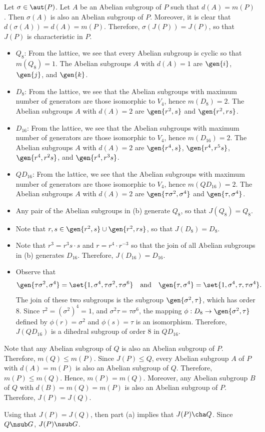 \begin{solenum}[spsol]
	\item Let $\sigma \in \aut(P)$.
	Let $A$ be an Abelian subgroup of $P$ such that $d(A) = m(P)$.
	Then $\sigma(A)$ is also an Abelian subgroup of $P$.
	Moreover, it is clear that $d(\sigma(A)) = d(A) = m(P)$.
	Therefore, $\sigma(J(P)) = J(P)$, so that $J(P)$ is characteristic in $P$.
	\item 
	\begin{itemize}
		\item $Q_8$: From the lattice, we see that every Abelian subgroup is cyclic so that $m(Q_8) = 1$.
	The Abelian subgroups $A$ with $d(A) = 1$ are $\gen{i}$, $\gen{j}$, and $\gen{k}$.
		\item $D_8$: From the lattice, we see that the Abelian subgroups with maximum number of generators are those isomorphic to $V_4$, hence $m(D_8) = 2$.
	The Abelian subgroups $A$ with $d(A) = 2$ are $\gen{r^2, s}$ and $\gen{r^2, rs}$.
		\item $D_{16}$: From the lattice, we see that the Abelian subgroups with maximum number of generators are those isomorphic to $V_4$, hence $m(D_{16}) = 2$.
	The Abelian subgroups $A$ with $d(A) = 2$ are $\gen{r^4, s}$, $\gen{r^4, r^5s}$, $\gen{r^4, r^2s}$, and $\gen{r^4, r^3s}$.
		\item $QD_{16}$: From the lattice, we see that the Abelian subgroups with maximum number of generators are those isomorphic to $V_4$, hence $m(QD_{16}) = 2$.
	The Abelian subgroups $A$ with $d(A) = 2$ are $\gen{\tau\sigma^2, \sigma^4}$ and $\gen{\tau, \sigma^4}$.
	\end{itemize}
	\item 
	\begin{itemize}
		\item Any pair of the Abelian subgroups in (b) generate $Q_8$, so that $J(Q_8) = Q_8$.
		\item Note that $r, s \in \gen{r^2, s} \cup \gen{r^2, rs}$, so that $J(D_8) = D_8$.
		\item Note that $r^3 = r^3s \cdot s$ and $r = r^4 \cdot r^{-3}$ so that the join of all Abelian subgroups in (b) generates $D_{16}$.
	Therefore, $J(D_{16}) = D_{16}$.
		\item Observe that
		\[
			\gen{\tau\sigma^2, \sigma^4} = \set{1, \sigma^4, \tau\sigma^2, \tau\sigma^6} \quad \text{and} \quad \gen{\tau, \sigma^4} = \set{1, \sigma^4, \tau, \tau\sigma^4}.
		\]
		The join of these two subgroups is the subgroup $\gen{\sigma^2, \tau}$, which has order 8.
	Since $\tau^2 = (\sigma^2)^4 = 1$, and $\sigma^2\tau = \tau\sigma^6$, the mapping $\phi : D_8 \to \gen{\sigma^2, \tau}$ defined by $\phi(r) = \sigma^2$ and $\phi(s) = \tau$ is an isomorphism.
	Therefore, $J(QD_{16})$ is a dihedral subgroup of order 8 in $QD_{16}$.
	\end{itemize}
	\item Note that any Abelian subgroup of $Q$ is also an Abelian subgroup of $P$.
	Therefore, $m(Q) \leq m(P)$.
	Since $J(P) \leq Q$, every Abelian subgroup $A$ of $P$ with $d(A) = m(P)$ is also an Abelian subgroup of $Q$.
	Therefore, $m(P) \leq m(Q)$.
	Hence, $m(P) = m(Q)$.
	Moreover, any Abelian subgroup $B$ of $Q$ with $d(B) = m(Q) = m(P)$ is also an Abelian subgroup of $P$.
	Therefore, $J(P) = J(Q)$.
	
	Using that $J(P) = J(Q)$, then part (a) implies that $J(P) \cha Q$.
	Since $Q \nsub G$, $J(P) \nsub G$.
\end{solenum}